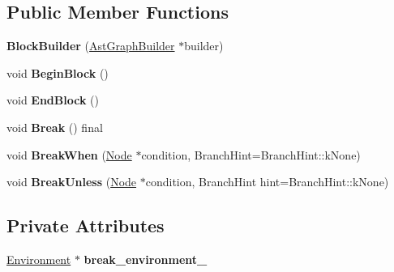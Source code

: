 \subsection*{Public Member Functions}
\begin{DoxyCompactItemize}
\item 
{\bfseries Block\+Builder} (\hyperlink{classv8_1_1internal_1_1compiler_1_1_ast_graph_builder}{Ast\+Graph\+Builder} $\ast$builder)\hypertarget{classv8_1_1internal_1_1compiler_1_1_block_builder_a184fca00dc910393dce85eb06427aa0e}{}\label{classv8_1_1internal_1_1compiler_1_1_block_builder_a184fca00dc910393dce85eb06427aa0e}

\item 
void {\bfseries Begin\+Block} ()\hypertarget{classv8_1_1internal_1_1compiler_1_1_block_builder_a1032d943be2dabaf076b30b0753fdb89}{}\label{classv8_1_1internal_1_1compiler_1_1_block_builder_a1032d943be2dabaf076b30b0753fdb89}

\item 
void {\bfseries End\+Block} ()\hypertarget{classv8_1_1internal_1_1compiler_1_1_block_builder_a3754dabb25a37574f670769bd000089d}{}\label{classv8_1_1internal_1_1compiler_1_1_block_builder_a3754dabb25a37574f670769bd000089d}

\item 
void {\bfseries Break} () final\hypertarget{classv8_1_1internal_1_1compiler_1_1_block_builder_a6acc3b3d10a7e5830ec40cc34410f7a1}{}\label{classv8_1_1internal_1_1compiler_1_1_block_builder_a6acc3b3d10a7e5830ec40cc34410f7a1}

\item 
void {\bfseries Break\+When} (\hyperlink{classv8_1_1internal_1_1compiler_1_1_node}{Node} $\ast$condition, Branch\+Hint=Branch\+Hint\+::k\+None)\hypertarget{classv8_1_1internal_1_1compiler_1_1_block_builder_a00f2011948ce759101462c7987385f56}{}\label{classv8_1_1internal_1_1compiler_1_1_block_builder_a00f2011948ce759101462c7987385f56}

\item 
void {\bfseries Break\+Unless} (\hyperlink{classv8_1_1internal_1_1compiler_1_1_node}{Node} $\ast$condition, Branch\+Hint hint=Branch\+Hint\+::k\+None)\hypertarget{classv8_1_1internal_1_1compiler_1_1_block_builder_a57aefa4a1a43a79a1e27f2ac4928a19f}{}\label{classv8_1_1internal_1_1compiler_1_1_block_builder_a57aefa4a1a43a79a1e27f2ac4928a19f}

\end{DoxyCompactItemize}
\subsection*{Private Attributes}
\begin{DoxyCompactItemize}
\item 
\hyperlink{classv8_1_1internal_1_1compiler_1_1_ast_graph_builder_1_1_environment}{Environment} $\ast$ {\bfseries break\+\_\+environment\+\_\+}\hypertarget{classv8_1_1internal_1_1compiler_1_1_block_builder_a816245ee5fdee720c29aa8de3916fe24}{}\label{classv8_1_1internal_1_1compiler_1_1_block_builder_a816245ee5fdee720c29aa8de3916fe24}

\end{DoxyCompactItemize}
